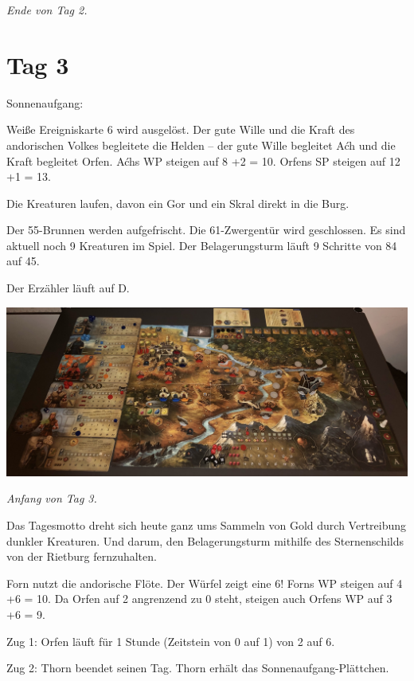 \documentclass[10pt, a4paper, oneside]{book}
\begin{document}
{\textit{Ende von Tag 2.}

\newpage
\section{Tag 3}


Sonnenaufgang:

Weiße Ereigniskarte 6 wird ausgelöst. Der gute Wille und die Kraft des andorischen Volkes begleitete die Helden – der gute Wille begleitet Aćh und die Kraft begleitet Orfen. Aćhs WP steigen auf 8 +2 = 10. Orfens SP steigen auf 12 +1 = 13.

Die Kreaturen laufen, davon ein Gor und ein Skral direkt in die Burg.

Der 55-Brunnen werden aufgefrischt. Die 61-Zwergentür wird geschlossen. Es sind aktuell noch 9 Kreaturen im Spiel. Der Belagerungsturm läuft 9 Schritte von 84 auf 45.

Der Erzähler läuft auf D.\bigskip


\includegraphics[width=\textwidth]{Das Erbe des Wunderkindes/Bilder/Tag 3 Anfang.jpg}

\textit{Anfang von Tag 3.}\bigskip


Das Tagesmotto dreht sich heute ganz ums Sammeln von Gold durch Vertreibung dunkler Kreaturen. Und darum, den Belagerungsturm mithilfe des Sternenschilds von der Rietburg fernzuhalten.



Forn nutzt die andorische Flöte. Der Würfel zeigt eine 6! Forns WP steigen auf 4 +6 = 10. Da Orfen auf 2 angrenzend zu 0 steht, steigen auch Orfens WP auf 3 +6 = 9.



Zug 1: Orfen läuft für 1 Stunde (Zeitstein von 0 auf 1) von 2 auf 6.



Zug 2: Thorn beendet seinen Tag. Thorn erhält das Sonnenaufgang-Plättchen.



}
\end{document}
